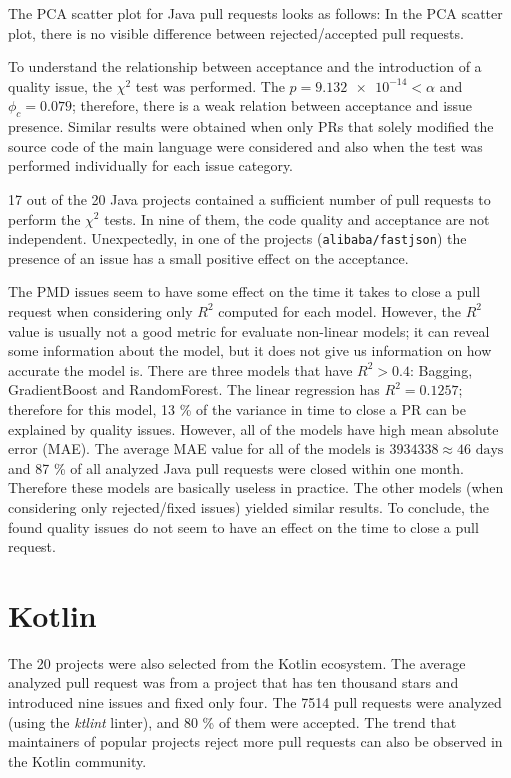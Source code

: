 \documentclass[digital,oneside,oldtable,nolof,nolot,nocover]{fithesis4}
\begin{document}
The PCA scatter plot for Java pull requests looks as follows:
In the PCA scatter plot, there is no visible difference between rejected/accepted pull requests.

To understand the relationship between acceptance and the introduction of a quality issue,
the \(\chi^2\) test was performed.
The \(p = \num{9.132e-14} < \alpha\) and \(\phi_c = 0.079\); therefore, there is
a weak relation between acceptance and issue presence. Similar results were
obtained when only PRs that solely modified the source code of the main language were
considered and also when the test was performed individually for each issue category.

17 out of the 20 Java projects contained a sufficient number of pull requests to
perform the \(\chi^2\) tests. In nine of them, the code quality and acceptance are
not independent. Unexpectedly, in one of the projects (\texttt{alibaba/fastjson}) the
presence of an issue has a small positive effect on the acceptance.

The PMD issues seem to have some effect on the time it takes to close a pull
request when considering only \(R^2\) computed for each model. However, the
\(R^2\) value is usually not a good metric for evaluate non-linear models;
it can reveal some information about the model, but it does not give us
information on how accurate the model is. There are three models that have \(R^2
   > 0.4\): Bagging, GradientBoost and RandomForest.  The linear regression has
\(R^2 = 0.1257\); therefore for this model, 13 \% of the variance in time to close a
PR can be explained by quality issues. However, all of the models have high mean
absolute error (MAE). The average MAE value for all of the models is \(3934338
   \approx 46\text{ days}\) and 87 \% of all analyzed Java pull requests were
closed within one month. Therefore these models are basically useless in
practice. The other models (when considering only rejected/fixed issues) yielded
similar results. To conclude, the found quality issues do not seem to have an
effect on the time to close a pull request.
\section{Kotlin}
\label{sec:orgdad0553}
The 20 projects were also selected from the Kotlin ecosystem.
The average analyzed pull request was from a project that has ten thousand
stars and introduced nine issues and fixed only four. The 7514 pull requests
were analyzed (using the \emph{ktlint} linter), and 80 \% of them were accepted.
The trend that maintainers of popular projects reject more pull requests can
also be observed in the Kotlin community.
\end{document}
